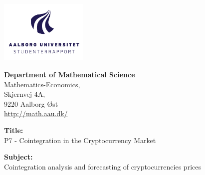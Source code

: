 
\begin{titlepage}
\thispagestyle{empty}
{}

\begin{minipage}[t]{0.48\textwidth}
\vspace*{-25pt}			%
\includegraphics[height=3cm]{1 Formalities/Intro/AAUlogo.pdf}
\end{minipage}
\hfill
\begin{minipage}[t]{0.48\textwidth}
{\small 
\textbf{Department of Mathematical Science}\\
Mathematics-Economics,\\
Skjernvej 4A,\\ 9220 Aalborg Øst \\ \hyperlink{http://math.aau.dk/}{http://math.aau.dk/}
}
\end{minipage}



\vspace*{1cm}

\begin{minipage}[t]{0.48\textwidth}
\textbf{Title:} \\[5pt]\hspace*{2ex}
\hspace*{-13pt}P7 - Cointegration in the Cryptocurrency Market\\\hspace*{2ex}

\textbf{Subject:} \\[5pt]\hspace*{2ex}
\hspace*{-13pt}Cointegration analysis and forecasting of cryptocurrencies prices\\\hspace*{2ex}
 


\end{minipage}
\end{titlepage}
